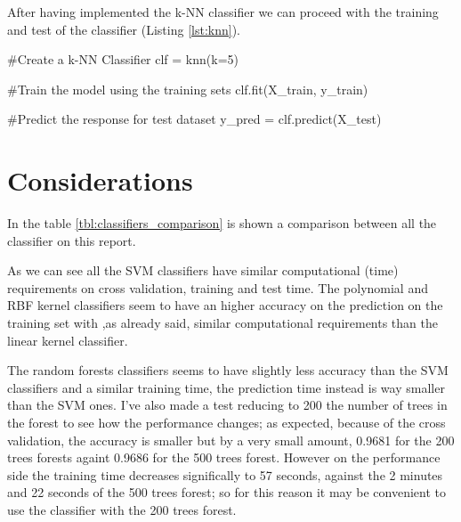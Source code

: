 \documentclass[12pt]{article}
\begin{document}
After having implemented the k-NN classifier we can proceed with the training and 
test of the classifier (Listing \ref{lst:knn}).

\begin{python}[caption={k-NN},label={lst:knn}]
#Create a k-NN Classifier
clf = knn(k=5) 

#Train the model using the training sets
clf.fit(X_train, y_train)

#Predict the response for test dataset
y_pred = clf.predict(X_test)
\end{python}

\section{Considerations}

In the table \ref{tbl:classifiers_comparison} is shown a comparison between all the 
classifier on this report.

As we can see all the SVM classifiers have similar computational (time) requirements
on cross validation, training and test time. The polynomial and RBF kernel 
classifiers seem to have an higher accuracy on the prediction on the training set with 
,as already said, similar computational requirements than the linear kernel 
classifier.

The random forests classifiers seems to have slightly less accuracy than the SVM
classifiers and a similar training time, the prediction time instead is way smaller
than the SVM ones. I've also made a test reducing to 200 the number of trees in the 
forest to see how the performance changes; as expected, because of the cross 
validation, the accuracy is smaller but by
a very small amount, 0.9681 for the 200 trees forests againt 0.9686 for the 500 
trees forest. However on the performance side the training time decreases significally
to 57 seconds, against the 2 minutes and 22 seconds of the 500 trees forest; so for 
this reason it may be convenient to use the classifier with the 200 trees forest. 
\end{document}
